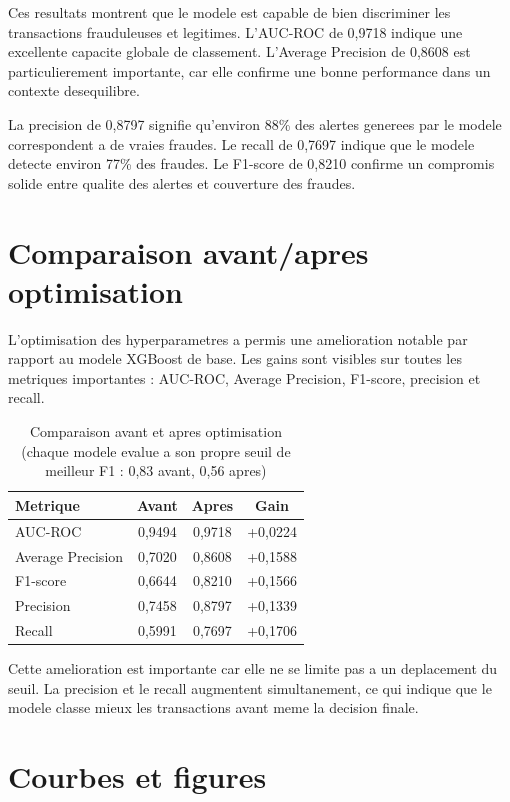 ﻿\documentclass[12pt,a4paper,oneside]{report}
\begin{document}
Ces resultats montrent que le modele est capable de bien discriminer les transactions frauduleuses et legitimes. L'AUC-ROC de 0,9718 indique une excellente capacite globale de classement. L'Average Precision de 0,8608 est particulierement importante, car elle confirme une bonne performance dans un contexte desequilibre.

La precision de 0,8797 signifie qu'environ 88\% des alertes generees par le modele correspondent a de vraies fraudes. Le recall de 0,7697 indique que le modele detecte environ 77\% des fraudes. Le F1-score de 0,8210 confirme un compromis solide entre qualite des alertes et couverture des fraudes.

\section{Comparaison avant/apres optimisation}

L'optimisation des hyperparametres a permis une amelioration notable par rapport au modele XGBoost de base. Les gains sont visibles sur toutes les metriques importantes : AUC-ROC, Average Precision, F1-score, precision et recall.

\begin{table}[H]
\centering
\caption{Comparaison avant et apres optimisation (chaque modele evalue a son propre seuil de meilleur F1 : 0,83 avant, 0,56 apres)}
\begin{tabular}{lccc}
\toprule
\textbf{Metrique} & \textbf{Avant} & \textbf{Apres} & \textbf{Gain} \\
\midrule
AUC-ROC & 0,9494 & 0,9718 & +0,0224 \\
Average Precision & 0,7020 & 0,8608 & +0,1588 \\
F1-score & 0,6644 & 0,8210 & +0,1566 \\
Precision & 0,7458 & 0,8797 & +0,1339 \\
Recall & 0,5991 & 0,7697 & +0,1706 \\
\bottomrule
\end{tabular}
\end{table}

Cette amelioration est importante car elle ne se limite pas a un deplacement du seuil. La precision et le recall augmentent simultanement, ce qui indique que le modele classe mieux les transactions avant meme la decision finale.

\section{Courbes et figures}
\end{document}
